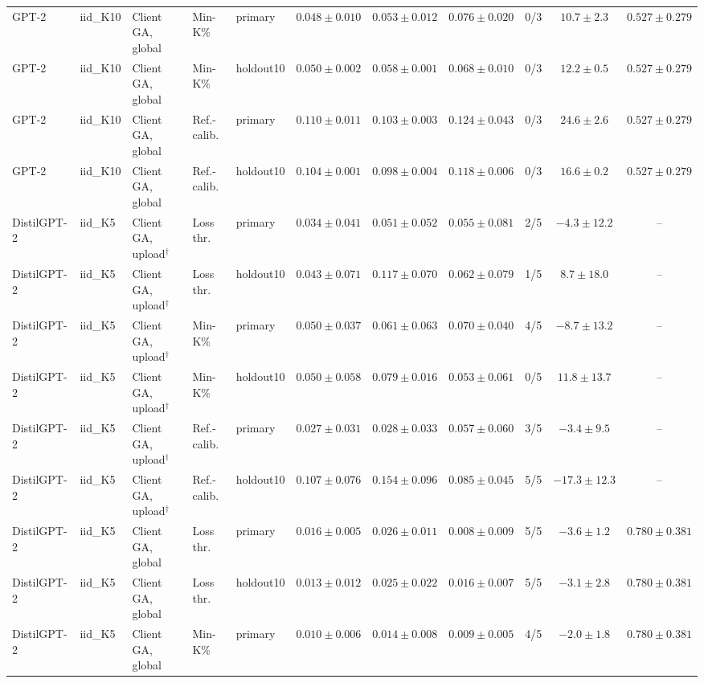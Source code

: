 {\begin{longtable}{@{\extracolsep{\fill}}lllllcccccc@{}}
GPT-2 & iid\_K10 & Client GA, global & Min-K\% & primary & $0.048 \pm 0.010$ & $0.053 \pm 0.012$ & $0.076 \pm 0.020$ & 0/3 & $10.7 \pm 2.3$ & $0.527 \pm 0.279$ \\
GPT-2 & iid\_K10 & Client GA, global & Min-K\% & holdout10 & $0.050 \pm 0.002$ & $0.058 \pm 0.001$ & $0.068 \pm 0.010$ & 0/3 & $12.2 \pm 0.5$ & $0.527 \pm 0.279$ \\
GPT-2 & iid\_K10 & Client GA, global & Ref.-calib. & primary & $0.110 \pm 0.011$ & $0.103 \pm 0.003$ & $0.124 \pm 0.043$ & 0/3 & $24.6 \pm 2.6$ & $0.527 \pm 0.279$ \\
GPT-2 & iid\_K10 & Client GA, global & Ref.-calib. & holdout10 & $0.104 \pm 0.001$ & $0.098 \pm 0.004$ & $0.118 \pm 0.006$ & 0/3 & $16.6 \pm 0.2$ & $0.527 \pm 0.279$ \\
DistilGPT-2 & iid\_K5 & Client GA, upload$^{\dagger}$ & Loss thr. & primary & $0.034 \pm 0.041$ & $0.051 \pm 0.052$ & $0.055 \pm 0.081$ & 2/5 & $-4.3 \pm 12.2$ & -- \\
DistilGPT-2 & iid\_K5 & Client GA, upload$^{\dagger}$ & Loss thr. & holdout10 & $0.043 \pm 0.071$ & $0.117 \pm 0.070$ & $0.062 \pm 0.079$ & 1/5 & $8.7 \pm 18.0$ & -- \\
DistilGPT-2 & iid\_K5 & Client GA, upload$^{\dagger}$ & Min-K\% & primary & $0.050 \pm 0.037$ & $0.061 \pm 0.063$ & $0.070 \pm 0.040$ & 4/5 & $-8.7 \pm 13.2$ & -- \\
DistilGPT-2 & iid\_K5 & Client GA, upload$^{\dagger}$ & Min-K\% & holdout10 & $0.050 \pm 0.058$ & $0.079 \pm 0.016$ & $0.053 \pm 0.061$ & 0/5 & $11.8 \pm 13.7$ & -- \\
DistilGPT-2 & iid\_K5 & Client GA, upload$^{\dagger}$ & Ref.-calib. & primary & $0.027 \pm 0.031$ & $0.028 \pm 0.033$ & $0.057 \pm 0.060$ & 3/5 & $-3.4 \pm 9.5$ & -- \\
DistilGPT-2 & iid\_K5 & Client GA, upload$^{\dagger}$ & Ref.-calib. & holdout10 & $0.107 \pm 0.076$ & $0.154 \pm 0.096$ & $0.085 \pm 0.045$ & 5/5 & $-17.3 \pm 12.3$ & -- \\
DistilGPT-2 & iid\_K5 & Client GA, global & Loss thr. & primary & $0.016 \pm 0.005$ & $0.026 \pm 0.011$ & $0.008 \pm 0.009$ & 5/5 & $-3.6 \pm 1.2$ & $0.780 \pm 0.381$ \\
DistilGPT-2 & iid\_K5 & Client GA, global & Loss thr. & holdout10 & $0.013 \pm 0.012$ & $0.025 \pm 0.022$ & $0.016 \pm 0.007$ & 5/5 & $-3.1 \pm 2.8$ & $0.780 \pm 0.381$ \\
DistilGPT-2 & iid\_K5 & Client GA, global & Min-K\% & primary & $0.010 \pm 0.006$ & $0.014 \pm 0.008$ & $0.009 \pm 0.005$ & 4/5 & $-2.0 \pm 1.8$ & $0.780 \pm 0.381$ \\

\end{longtable}}
